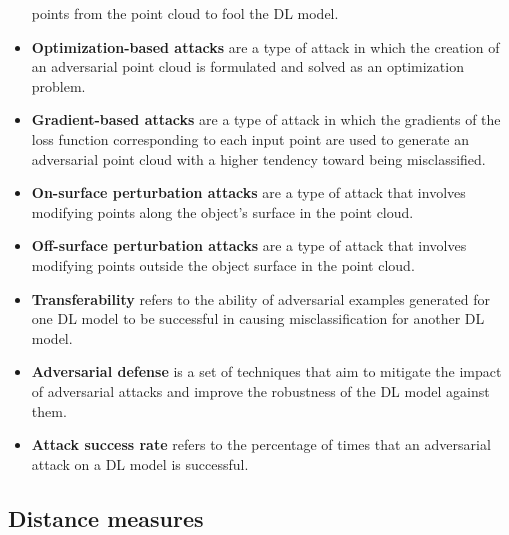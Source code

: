 \documentclass{ieeeaccess}
\begin{document}
\begin{itemize}
points %
from the %
point cloud to fool the DL model.
\item \textbf{Optimization-based attacks} are a type of attack in which %
the creation of an adversarial point cloud is formulated and solved as an optimization problem.
\item \textbf{Gradient-based attacks} are a type of attack in which %
the gradients of the loss function corresponding to each input point are %
used to generate an adversarial point cloud with a higher tendency toward being misclassified. 
\item \textbf{On-surface perturbation attacks} are a type of %
attack that involves modifying points along the object's surface in the point cloud.
\item \textbf{Off-surface perturbation attacks} are a type of %
attack that involves modifying points outside the object surface in the point cloud. %
\item \textbf{Transferability} refers to the ability of adversarial examples generated for one DL model to be successful in causing misclassification for another DL model. %
\item \textbf{Adversarial defense} is a set of techniques that aim to mitigate the impact of adversarial attacks and improve the robustness of the DL model against them.
\item \textbf{Attack success rate} refers to the percentage of times that an adversarial attack on a DL model is successful.
\end{itemize}


\subsection{Distance measures}
\label{sec:Measurement}
\end{document}
